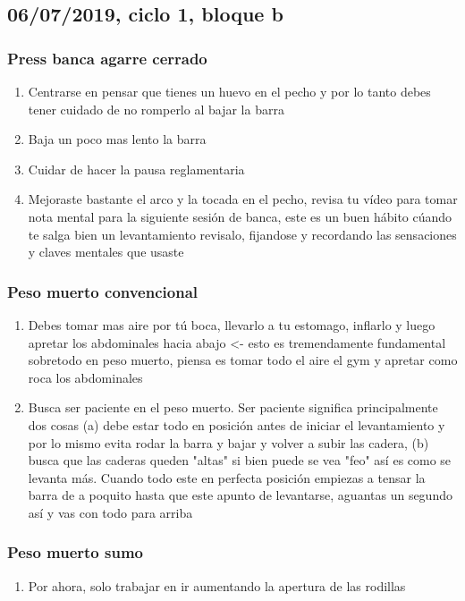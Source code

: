 \documentclass[11pt]{article}
\begin{document}
\subsection{06/07/2019, ciclo 1, bloque b}
\label{sec:org337ad69}
\subsubsection{Press banca agarre cerrado}
\label{sec:org25b7c1b}
\begin{enumerate}
\item Centrarse en pensar que tienes un huevo en el pecho y por lo tanto
debes tener cuidado de no romperlo al bajar la barra
\item Baja un poco mas lento la barra
\item Cuidar de hacer la pausa reglamentaria
\item Mejoraste bastante el arco y la tocada en el pecho, revisa tu vídeo
para tomar nota mental para la siguiente sesión de banca, este es
un buen hábito cúando te salga bien un levantamiento revisalo,
fijandose y recordando las sensaciones y claves mentales que usaste
\end{enumerate}
\subsubsection{Peso muerto convencional}
\label{sec:org5d34456}
\begin{enumerate}
\item Debes tomar mas aire por tú boca, llevarlo a tu estomago, inflarlo
y luego apretar los abdominales hacia abajo <- esto es
tremendamente fundamental sobretodo en peso muerto, piensa es tomar
todo el aire el gym y apretar como roca los abdominales
\item Busca ser paciente en el peso muerto. Ser paciente significa
principalmente dos cosas (a) debe estar todo en posición antes de
iniciar el levantamiento y por lo mismo evita rodar la barra y
bajar y volver a subir las cadera, (b) busca que las caderas queden
"altas" si bien puede se vea "feo" así es como se levanta
más. Cuando todo este en perfecta posición empiezas a tensar la
barra de a poquito hasta que este apunto de levantarse, aguantas un
segundo así y vas con todo para arriba
\end{enumerate}
\subsubsection{Peso muerto sumo}
\label{sec:org964ce05}
\begin{enumerate}
\item Por ahora, solo trabajar en ir aumentando la apertura de las rodillas
\end{enumerate}
\end{document}

